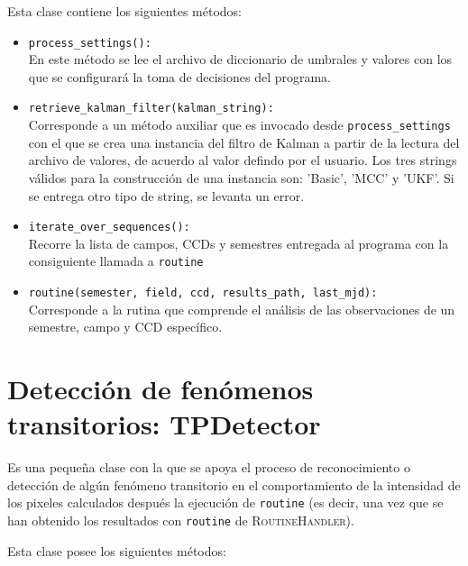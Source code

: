 Esta clase contiene los siguientes m\'etodos:
\begin{itemize}
\item \texttt{process\_settings():}\\
En este m\'etodo se lee el archivo de diccionario de umbrales y valores con los que se configurar\'a la toma de decisiones del programa.
\bigskip

\item \texttt{retrieve\_kalman\_filter(kalman\_string):}\\
Corresponde a un m\'etodo auxiliar que es invocado desde \texttt{process\_settings} con el que se crea una instancia del filtro de Kalman a partir de la lectura del archivo de valores, de acuerdo al valor defindo por el usuario. Los tres strings v\'alidos para la construcci\'on de una instancia son: 'Basic', 'MCC' y 'UKF'. Si se entrega otro tipo de string, se levanta un error.
\bigskip
  
\item \texttt{iterate\_over\_sequences():}\\
Recorre la lista de campos, CCDs y semestres entregada al programa con la consiguiente llamada a \texttt{routine}
\bigskip

\item \texttt{routine(semester, field, ccd, results\_path, last\_mjd):}\\
Corresponde a la rutina que comprende el an\'alisis de las observaciones de un semestre, campo y CCD espec\'ifico. 
\end{itemize}  
\bigskip

\section{Detecci\'on de fen\'omenos transitorios: \textbf{TPDetector}}
Es una peque\~na clase con la que se apoya el proceso de reconocimiento o detecci\'on de alg\'un fen\'omeno transitorio en el comportamiento de la intensidad de los pixeles calculados despu\'es la ejecuci\'on de \texttt{routine} (es decir, una vez que se han obtenido los resultados con \texttt{routine} de \textsc{RoutineHandler}).
\bigskip

Esta clase posee los siguientes m\'etodos:

